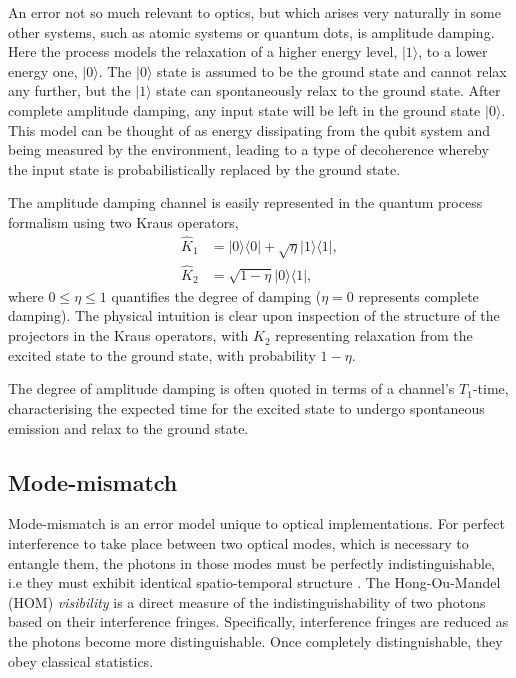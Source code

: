 \documentclass[aps,rmp,twocolumn,amsmath,amssymb,nofootinbib,superscriptaddress,longbibliography,floatfix]{revtex4-1}
\newcommand{\bra}[1]{\langle#1|}
\newcommand{\ket}[1]{|#1\rangle}
\begin{document}
An error not so much relevant to optics, but which arises very naturally in some other systems, such as atomic systems or quantum dots, is amplitude damping. Here the process models the relaxation of a higher energy level, $\ket{1}$, to a lower energy one, $\ket{0}$. The $\ket{0}$ state is assumed to be the ground state and cannot relax any further, but the $\ket{1}$ state can spontaneously relax to the ground state. After complete amplitude damping, any input state will be left in the ground state $\ket{0}$. This model can be thought of as energy dissipating from the qubit system and being measured by the environment, leading to a type of decoherence whereby the input state is probabilistically replaced by the ground state.

The amplitude damping channel is easily represented in the quantum process formalism using two Kraus operators,
\begin{align}
\hat{K}_1 &= \ket{0}\bra{0} + \sqrt\eta\ket{1}\bra{1}, \nonumber \\
\hat{K}_2 &= \sqrt{1-\eta}\ket{0}\bra{1}, 
\end{align}
where \mbox{$0\leq\eta\leq 1$} quantifies the degree of damping (\mbox{$\eta=0$} represents complete damping). The physical intuition is clear upon inspection of the structure of the projectors in the Kraus operators, with $\hat{K}_2$ representing relaxation from the excited state to the ground state, with probability \mbox{$1-\eta$}.

The degree of amplitude damping is often quoted in terms of a channel's $T_1$-time, characterising the expected time for the excited state to undergo spontaneous emission and relax to the ground state.

%
%

\subsection{Mode-mismatch} \label{sec:MM_error}

Mode-mismatch is an error model unique to optical implementations. For perfect interference to take place between two optical modes, which is necessary to entangle them, the photons in those modes must be perfectly indistinguishable, i.e they must exhibit identical spatio-temporal structure \cite{bib:RohdeMauererSilberhorn07}. The Hong-Ou-Mandel (HOM) \cite{bib:HOM87} \emph{visibility} is a direct measure of the indistinguishability of two photons based on their interference fringes. Specifically, interference fringes are reduced as the photons become more distinguishable. Once completely distinguishable, they obey classical statistics.
\end{document}
